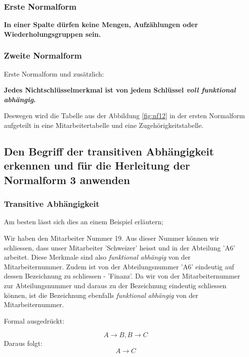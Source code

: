 \subsubsection{Erste Normalform}

\begin{center}
    \textbf{In einer Spalte dürfen keine Mengen, Aufzählungen oder Wiederholungsgruppen sein.}
\end{center}

\subsubsection{Zweite Normalform}
Erste Normalform und zusätzlich:

\begin{center}
    \textbf{Jedes Nichtschlüsselmerkmal ist von jedem Schlüssel \textit{voll funktional abhängig}.}
\end{center}

Deswegen wird die Tabelle aus der Abbildung \ref{fig:nf12} in der ersten Normalform aufgeteilt in eine Mitarbeitertabelle und eine Zugehörigkeitstabelle.

\subsection{Den Begriff der transitiven Abhängigkeit erkennen und für die Herleitung der Normalform 3 anwenden}

\subsubsection{Transitive Abhängigkeit}
Am besten lässt sich dies an einem Beispiel erläutern;


Wir haben den Mitarbeiter Nummer 19. Aus dieser Nummer können wir schliessen, dass unser Mitarbeiter 'Schweizer' heisst und in der Abteilung 'A6' arbeitet. Diese Merkmale sind also \emph{funktional abhängig} von der Mitarbeiternummer. Zudem ist von der Abteilungsnummer 'A6' eindeutig auf dessen Bezeichnung zu schliessen - 'Finanz'. Da wir von der Mitarbeiternummer zur Abteilungsnummer und daraus zu der Bezeichnung eindeutig schliessen können, ist die Bezeichnung ebenfalls \emph{funktional abhängig} von der Mitarbeiternummer.

Formal ausgedrückt:

\begin{equation*}
    A\rightarrow B , B\rightarrow C
\end{equation*}
Daraus folgt:
\begin{equation*}
    A\rightarrow C
\end{equation*}

